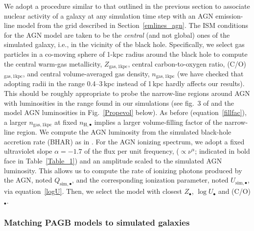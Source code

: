 \documentclass[fleqn,usenatbib]{mnras}
\begin{document}
We adopt a procedure similar to that outlined in the previous section
to associate nuclear activity of a galaxy at any simulation time step
with an AGN emission-line model from the \citet{Feltre16} grid
described in Section~\ref{emlines_agn}. The ISM  conditions for the
AGN model are taken to be the {\it central} (and not global) ones  of
the simulated galaxy, i.e., in the vicinity of the black
hole. Specifically, we select gas particles  in a co-moving sphere of
1-kpc radius around the black hole to compute the central warm-gas
metallicity, $Z_{\mathrm{gas, 1kpc}}$, central carbon-to-oxygen ratio,
(C/O)$_{\mathrm{gas, 1kpc}}$, and central volume-averaged gas density,
$n_{\mathrm{gas, 1kpc}}$ (we have checked that  adopting radii in
the range 0.4--3\,kpc instead of 1\,kpc hardly affects our
results). This should be roughly appropriate to probe the
narrow-line regions around AGN with luminosities in the range found
in our simulations (see fig.~3 of \citealt{Hainline14} and
the model AGN luminosities in Fig.~\ref{Propevol} below). 
As before (equation~\ref{fillfac}), a larger $n_{\mathrm{gas,
    1kpc}}$ at fixed $n_{\mathrm{H},  \bullet}$ implies a larger
volume-filling factor of the narrow-line region. We compute the AGN
luminosity from the simulated black-hole accretion rate (BHAR) as in
\citet{Hirschmann14}. For  the AGN ionizing spectrum, we adopt a
  fixed ultraviolet slope $\alpha =-1.7$ of the flux per unit
  frequency, ($\propto \nu^\alpha$; indicated in bold face in
  Table~\ref{Table_1}) and an amplitude scaled to the simulated
  AGN luminosity. This allows us to compute the  rate of ionizing 
photons produced by the AGN, noted $Q_{\mathrm{sim},\bullet}$,  and
the corresponding ionization parameter, noted
$U_{\mathrm{sim},\bullet}$, via equation~\eqref{logU}.   Then, we
select the \citet{Feltre16} model with closest $Z_{\bullet}$, $\log
U_{\bullet}$ and (C/O)$_\bullet$.  


\subsubsection{Matching PAGB models to simulated galaxies}\label{pagbmatch}
\end{document}
